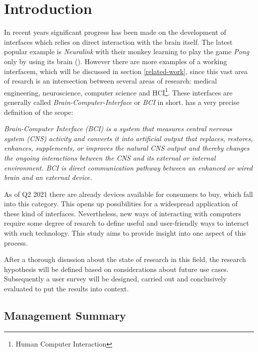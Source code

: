     \chapter{Introduction}\label{introduction}

        In recent years significant progress has been made on the development of interfaces which relies on direct interaction with the brain itself. The latest popular example is \textit{Neuralink} with their monkey learning to play the game \textit{Pong} only by using its brain (\cite{Neuralink.2021}). However there are more examples of a working interfacem, which will be discussed in section \ref*{related-work}, since this vast area of resarch is an intersection between several areas of research: medical engineering, neuroscience, computer science and HCI\footnote{Human Computer Interaction}.
        These interfaces are generally called \textit{Brain-Computer-Interface} or \textit{BCI} in short. \cite{MicrosoftResearch.23102020} has a very precise definition of the scope:

        \medskip
            \emph{Brain-Computer Interface (BCI) is a system that measures central nervous system (CNS) activity and converts it into artificial output that replaces, restores, enhances, supplements, or improves the natural CNS output and thereby changes the ongoing interactions between the CNS and its external or internal environment. BCI is direct communication pathway between an enhanced or wired brain and an external device.}
        \medskip

        As of Q2 2021 there are already devices available for consumers to buy, which fall into this category. This opens up possibilities for a widespread application of these kind of interfaces. Nevertheless, new ways of interacting with computers require some degree of resarch to define useful and user-friendly ways to interact with such technology. This study aims to provide insight into one aspect of this process.

        After a thorough disussion about the state of research in this field, the research hypothesis will be defined based on considerations about future use cases. Subsequently a user survey will be designed, carried out and conclusively evaluated to put the results into context.

        \clearpage\thispagestyle{empty}
        
        \section{Management Summary}

